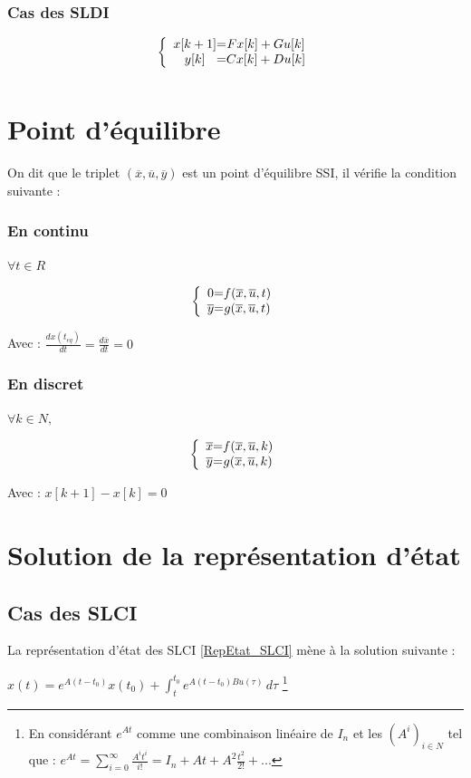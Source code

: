 \subsubsection{Cas des SLDI}
\LARGE{
    \[
\left \{
\begin{array}{c @{=} c}
    x[k+1] & Fx[k] + Gu[k]\\
    y[k] & Cx[k] + Du[k]
\end{array}
\right.
\]
}
\begin{equation}
    \label{RepEtat_SLDI}
\end{equation}
\newpage
\section{Point d'équilibre}
On dit que le triplet $(\overline{x},\overline{u},\overline{y})$ est un point d'équilibre SSI, il vérifie la condition suivante :
\subsubsection{En continu} 
$\forall t \in R$
\begin{center}
    \LARGE{
    \[
\left \{
\begin{array}{c @{=} c}
    0 & f(\overline{x},\overline{u}, t)\\
    \overline{y} & g(\overline{x},\overline{u},t)
\end{array}
\right.
\]  
}
\end{center}
Avec : $\frac{dx(t_{eq})}{dt} = \frac{d\overline{x}}{dt} = 0$
\subsubsection{En discret}
$\forall k \in N,$
\begin{center}
    \LARGE{
    \[
\left \{
\begin{array}{c @{=} c}
    \overline{x} & f(\overline{x},\overline{u},k)\\
    \overline{y} & g(\overline{x},\overline{u},k)
\end{array}
\right.
\]
}
\end{center}
Avec : $x[k+1] - x[k] = 0$
\newline
\section{Solution de la représentation d'état}
\subsection{Cas des SLCI}
La représentation d'état des SLCI \eqref{RepEtat_SLCI} mène à la solution suivante : 
\begin{center}
    \Large{$
    x(t) = e^{A(t-t_{0})}x(t_{0}) + 
     \int_{t}^{t_{0}}{ e^{A(t-t_{0})Bu(\tau)} \,d\tau}
    $} 
    \footnote{
    En considérant $e^{At}$ comme une combinaison linéaire de $I_{n}$ et les $(A^{i})_{i \in N}$ tel que : \newline
    $e^{At} = \sum_{i=0}^{\infty}{
    \frac{A^{i}t^{i}}{i!} = 
    I_{n} + At + A^{2}\frac{t^{2}}{2!} + ...
    }$
    }
\end{center}

